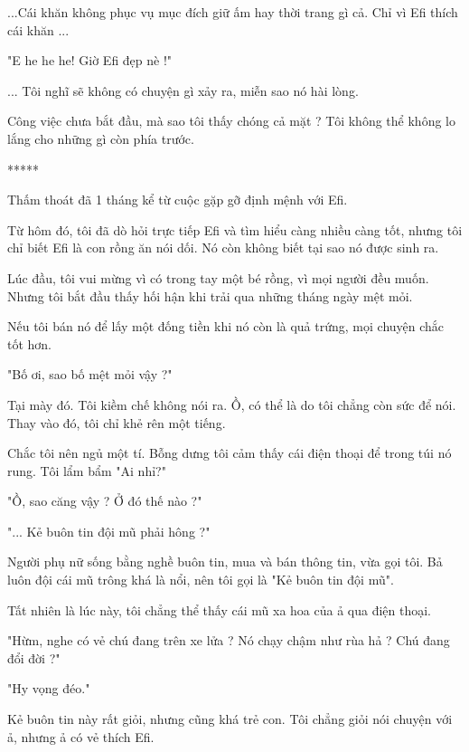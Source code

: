 ...Cái khăn không phục vụ mục đích giữ ấm hay thời trang gì cả. Chỉ vì Efi thích cái khăn ... 

"E he he he! Giờ Efi đẹp nè !"

... Tôi nghĩ sẽ không có chuyện gì xảy ra, miễn sao nó hài lòng.

Công việc chưa bắt đầu, mà sao tôi thấy chóng cả mặt ? Tôi không thể không lo lắng cho những gì còn phía trước.  \\

\begin{center}
	*****
\end{center}

Thấm thoát đã 1 tháng kể từ cuộc gặp gỡ định mệnh với Efi. 

Từ hôm đó, tôi đã dò hỏi trực tiếp Efi và tìm hiểu càng nhiều càng tốt, nhưng tôi chỉ biết Efi là con rồng ăn nói dối. Nó còn không biết tại sao nó được sinh ra. 

Lúc đầu, tôi vui mừng vì có trong tay một bé rồng, vì mọi người đều muốn. Nhưng tôi bắt đầu thấy hối hận khi trải qua những tháng ngày mệt mỏi.

Nếu tôi bán nó để lấy một đống tiền khi nó còn là quả trứng, mọi chuyện chắc tốt hơn. 

"Bố ơi, sao bố mệt mỏi vậy ?"

Tại mày đó. Tôi kiềm chế không nói ra. Ồ, có thể là do tôi chẳng còn sức để nói. Thay vào đó, tôi chỉ khẻ rên một tiếng.

Chắc tôi nên ngủ một tí. Bỗng dưng tôi cảm thấy cái điện thoại để trong túi nó rung. Tôi lẩm bẩm "Ai nhỉ?"

"Ồ, sao căng vậy ? Ở đó thế nào ?"

"... Kẻ buôn tin đội mũ phải hông ?"

Người phụ nữ sống bằng nghề buôn tin, mua và bán thông tin, vừa gọi tôi. Bả luôn đội cái mũ trông khá là nổi, nên tôi gọi là "Kẻ buôn tin đội mũ".

Tất nhiên là lúc này, tôi chẳng thể thấy cái mũ xa hoa của ả qua điện thoại. 

"Hừm, nghe có vẻ chú đang trên xe lửa ? Nó chạy chậm như rùa hả ? Chú đang đổi đời ?"

"Hy vọng đéo."

Kẻ buôn tin này rất giỏi, nhưng cũng khá trẻ con. Tôi chẳng giỏi nói chuyện với ả, nhưng ả có vẻ thích Efi. 

